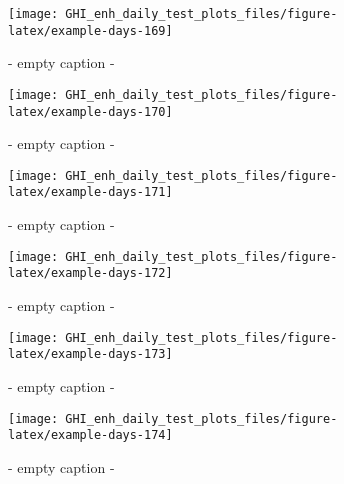 \documentclass[
  10pt,
  a4paper,oneside]{article}
\begin{document}
\begin{figure}[H]

{\centering \texttt{[image: GHI\_enh\_daily\_test\_plots\_files/figure-latex/example-days-169]} 

}

\caption{ - empty caption - }\label{fig:example-days-169}
\end{figure}

\begin{figure}[H]

{\centering \texttt{[image: GHI\_enh\_daily\_test\_plots\_files/figure-latex/example-days-170]} 

}

\caption{ - empty caption - }\label{fig:example-days-170}
\end{figure}

\begin{figure}[H]

{\centering \texttt{[image: GHI\_enh\_daily\_test\_plots\_files/figure-latex/example-days-171]} 

}

\caption{ - empty caption - }\label{fig:example-days-171}
\end{figure}

\begin{figure}[H]

{\centering \texttt{[image: GHI\_enh\_daily\_test\_plots\_files/figure-latex/example-days-172]} 

}

\caption{ - empty caption - }\label{fig:example-days-172}
\end{figure}

\begin{figure}[H]

{\centering \texttt{[image: GHI\_enh\_daily\_test\_plots\_files/figure-latex/example-days-173]} 

}

\caption{ - empty caption - }\label{fig:example-days-173}
\end{figure}

\begin{figure}[H]

{\centering \texttt{[image: GHI\_enh\_daily\_test\_plots\_files/figure-latex/example-days-174]} 

}

\caption{ - empty caption - }\label{fig:example-days-174}
\end{figure}
\end{document}
